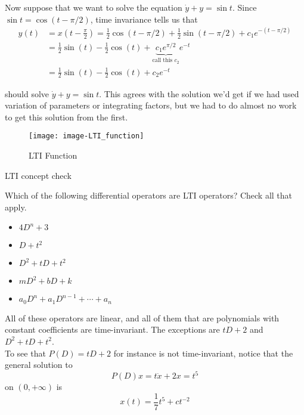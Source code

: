 Now suppose that we want to solve the equation $\dot{y}+y=\sin t$.
Since $\sin t=\cos \left(t-\pi /2\right)$, time invariance tells us that
\begin{align*}
  \displaystyle  y\left(t\right)
  &\displaystyle =x\left(t-\frac{\pi }{2}\right)
    =\frac12\cos \left(t-\pi /2\right) + \frac12 \sin \left(t-\pi /2\right)+c_1e^{-\left(t-\pi /2\right)} \\
  &\displaystyle =
    \frac12\sin \left(t\right) - \frac12 \cos \left(t\right)+
    \underbrace{c_1e^{\pi /2}}_{\textrm{call this }c_{2}}e^{-t} \\
  &\displaystyle =\frac12\sin \left(t\right) - \frac12 \cos \left(t\right)+c_2e^{-t}
\end{align*}

should solve $\dot{y}+y=\sin t$.
This agrees with the solution we'd get if we had used variation of parameters or integrating factors,
but we had to do almost no work to get this solution from the first.
\begin{figure}[ht!]
  \centering
  \texttt{[image: image-LTI\_function]}
  \caption{LTI Function}
\end{figure}

\begin{exercise}
  LTI concept check
\end{exercise}

Which of the following differential operators are LTI operators? Check all that apply.
\begin{itemize}
\item $4D^ n + 3$
\item $D + t^2$
\item $D^2 +tD + t^2$
\item $mD^2 +bD +k$
\item $a_0D^ n + a_1D^{n-1} + \cdots + a_ n$
\end{itemize}

All of these operators are linear, and all of them that are polynomials with constant coefficients are time-invariant.
The exceptions are $tD + 2$ and $D^2 +tD + t^2$. \\
To see that $P\left(D\right)=tD + 2$ for instance is not time-invariant,
notice that the general solution to
\begin{equation*}
  \displaystyle  P\left(D\right)x=t\dot{x}+2x=t^5
\end{equation*}
on $\left(0,+\infty \right)$ is
\begin{equation*}
  \displaystyle  x\left(t\right)=\frac{1}{7}t^{5}+ct^{-2}
\end{equation*}

